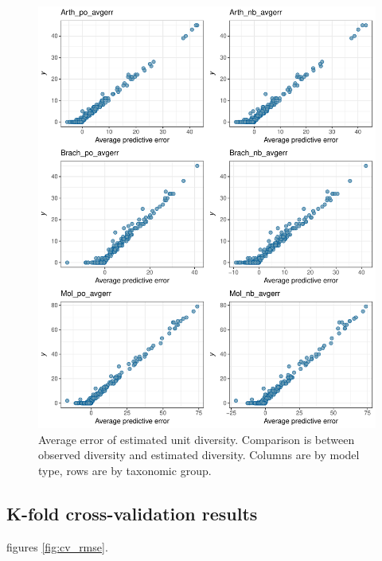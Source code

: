 \documentclass[12pt,letterpaper]{article}
\begin{document}
\afterpage{\clearpage}
\begin{figure}[h]
  \centering
  \includegraphics[width=\textwidth,height=0.8\textheight,keepaspectratio=true]{figure/ppc_avgerr}
  \caption{Average error of estimated unit diversity. Comparison is between observed diversity and estimated diversity. Columns are by model type, rows are by taxonomic group.}
  \label{fig:ppc_avgerr}
\end{figure}


\subsection{K-fold cross-validation results}
figures \ref{fig:cv_rmse}.
\end{document}
